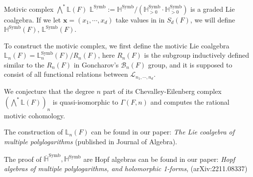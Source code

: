 \documentclass[8pt]{beamer}
\DeclareMathOperator{\Symb}{Symb}
\theoremstyle{definition}
\theoremstyle{remark}
\begin{document}
\begin{frame}[t]{Motivic complex $\bigwedge^*\mathbb L(F)$}
$\mathbb L^{\Symb}:=\mathbb H^{\Symb} / (\mathbb H^{\Symb}_{>0}\cdot \mathbb H^{\Symb}_{>0})$ is a graded Lie coalgebra. If we let $\mathbf x=(x_1,\cdots,x_d)$ take values in in $S_d(F)$, we will define $\mathbb H^{\Symb}(F)$, $\mathbb L^{\Symb}(F)$.
\vspace{10pt}

To construct the motivic complex, we first define the motivic Lie coalgebra $\mathbb L_n(F)=\mathbb L_n^{\Symb}(F)/R_n(F)$, here $R_n(F)$ is the subgroup inductively defined similar to the $R_n(F)$ in Goncharov's $\mathcal B_n(F)$ group, and it is supposed to consist of all functional relations between $\mathcal L_{n_1,\cdots,n_d}$.
\vspace{10pt}

We conjecture that the degree $n$ part of its Chevalley-Eilenberg complex $(\bigwedge^*\mathbb L(F))_n$ is quasi-isomorphic to $\Gamma(F,n)$ and computes the rational motivic cohomology.
\vspace{10pt}

The construction of $\mathbb L_n(F)$ can be found in our paper: \textit{The Lie coalgebra of multiple polylogarithms} (published in Journal of Algebra).

The proof of $\overline{\mathbb H}^{\Symb}, \mathbb H^{\Symb}$ are Hopf algebras can be found in our paper: \textit{Hopf algebras of multiple polylogarithms, and holomorphic 1-forms}, (arXiv:2211.08337)
\end{frame}
\end{document}
